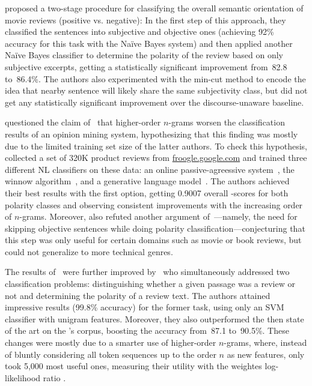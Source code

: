 
\citet{Pang:04} proposed a two-stage procedure for classifying the
overall semantic orientation of movie reviews (positive vs. negative):
In the first step of this approach, they classified the sentences into
subjective and objective ones (achieving 92\% accuracy for this task
with the Na\"ive Bayes system) and then applied another Na\"ive Bayes
classifier to determine the polarity of the review based on only
subjective excerpts, getting a statistically significant improvement
from~82.8 to~86.4\%.  The authors also experimented with the min-cut
method to encode the idea that nearby sentence will likely share the
same subjectivity class, but did not get any statistically significant
improvement over the discourse-unaware baseline.


\citet{Cui:06} questioned the claim of~\citet{Pang:02} that
higher-order $n$-grams worsen the classification results of an opinion
mining system, hypothesizing that this finding was mostly due to the
limited training set size of the latter authors.  To check this
hypothesis, \citeauthor{Cui:06} collected a set of 320K product
reviews from \url{froogle.google.com} and trained three different NL
classifiers on these data: an online passive-agreessive
system~\cite{Crammer:06}, the winnow algorithm~\cite{Hurst:04}, and a
generative language model~\cite{Manning:99}.  The authors achieved
their best results with the first option, getting 0.9007 overall
\F-scores for both polarity classes and observing consistent
improvements with the increasing order of $n$-grams.  Moreover,
\citeauthor{Cui:06} also refuted another argument
of~\citet{Pang:04}---namely, the need for skipping objective sentences
while doing polarity classification---conjecturing that this step was
only useful for certain domains such as movie or book reviews, but
could not generalize to more technical genres.


The results of~\citet{Pang:04} were further improved by~\citet{Ng:06}
who simultaneously addressed two classification problems:
distinguishing whether a given passage was a review or not and
determining the polarity of a review text.  The authors attained
impressive results (99.8\% accuracy) for the former task, using only
an SVM classifier with unigram features.  Moreover, they also
outperformed the then state of the art on the \citet{Pang:04}'s
corpus, boosting the accuracy from~87.1 to~90.5\%.  These changes were
mostly due to a smarter use of higher-order $n$-grams, where, instead
of bluntly considering all token sequences up to the order $n$ as new
features, \citet{Ng:06} only took 5,000 most useful ones, measuring
their utility with the weightes log-likelihood ratio \cite{Nigam:00}.

